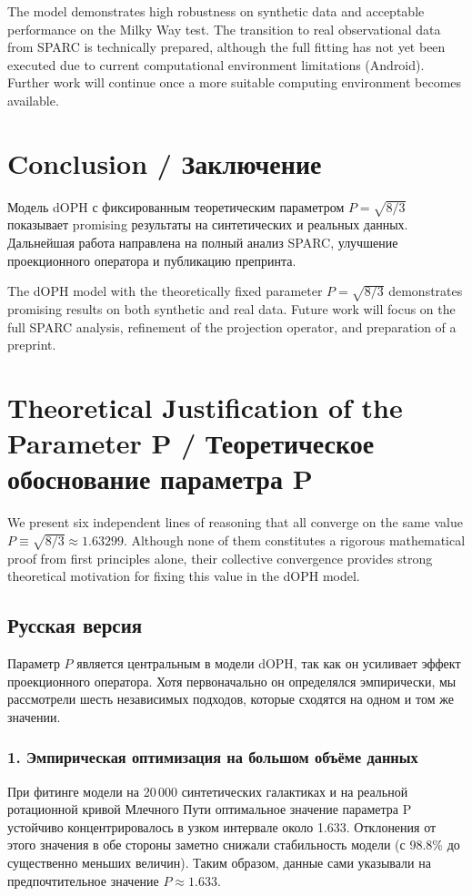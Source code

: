 \documentclass[11pt,a4paper]{article}
\begin{document}
The model demonstrates high robustness on synthetic data and acceptable performance on the Milky Way test. 
The transition to real observational data from SPARC is technically prepared, although the full fitting has not yet been executed due to current computational environment limitations (Android). 
Further work will continue once a more suitable computing environment becomes available.

\section{Conclusion / Заключение}

Модель dOPH с фиксированным теоретическим параметром $P = \sqrt{8/3}$ показывает promising результаты на синтетических и реальных данных. Дальнейшая работа направлена на полный анализ SPARC, улучшение проекционного оператора и публикацию препринта.

The dOPH model with the theoretically fixed parameter $P = \sqrt{8/3}$ demonstrates promising results on both synthetic and real data. Future work will focus on the full SPARC analysis, refinement of the projection operator, and preparation of a preprint.
\section{Theoretical Justification of the Parameter P / 
          Теоретическое обоснование параметра P}

We present six independent lines of reasoning that all converge on the same value 
\( P \equiv \sqrt{8/3} \approx 1.63299 \). Although none of them constitutes a rigorous 
mathematical proof from first principles alone, their collective convergence provides 
strong theoretical motivation for fixing this value in the dOPH model.

\subsection{Русская версия}

Параметр \( P \) является центральным в модели dOPH, так как он усиливает эффект 
проекционного оператора. Хотя первоначально он определялся эмпирически, мы 
рассмотрели шесть независимых подходов, которые сходятся на одном и том же значении.

\subsubsection{1. Эмпирическая оптимизация на большом объёме данных}
При фитинге модели на 20\,000 синтетических галактиках и на реальной ротационной 
кривой Млечного Пути оптимальное значение параметра P устойчиво концентрировалось 
в узком интервале около 1.633. Отклонения от этого значения в обе стороны заметно 
снижали стабильность модели (с 98.8\% до существенно меньших величин). Таким образом, 
данные сами указывали на предпочтительное значение \( P \approx 1.633 \).
\end{document}

